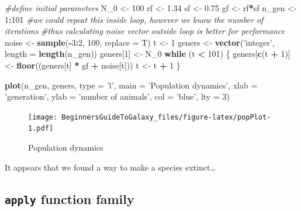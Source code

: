 \documentclass[]{book}
\newenvironment{Shaded}{\begin{snugshade}}{\end{snugshade}}
\newcommand{\KeywordTok}[1]{\textcolor[rgb]{0.13,0.29,0.53}{\textbf{#1}}}
\newcommand{\DataTypeTok}[1]{\textcolor[rgb]{0.13,0.29,0.53}{#1}}
\newcommand{\DecValTok}[1]{\textcolor[rgb]{0.00,0.00,0.81}{#1}}
\newcommand{\FloatTok}[1]{\textcolor[rgb]{0.00,0.00,0.81}{#1}}
\newcommand{\StringTok}[1]{\textcolor[rgb]{0.31,0.60,0.02}{#1}}
\newcommand{\CommentTok}[1]{\textcolor[rgb]{0.56,0.35,0.01}{\textit{#1}}}
\newcommand{\ControlFlowTok}[1]{\textcolor[rgb]{0.13,0.29,0.53}{\textbf{#1}}}
\newcommand{\OperatorTok}[1]{\textcolor[rgb]{0.81,0.36,0.00}{\textbf{#1}}}
\newcommand{\NormalTok}[1]{#1}
\theoremstyle{definition}
\theoremstyle{definition}
\theoremstyle{definition}
\theoremstyle{remark}
\begin{document}
\begin{Shaded}
\begin{Highlighting}[]
\CommentTok{#define initial parameters}
\NormalTok{N_}\DecValTok{0}\NormalTok{   <-}\StringTok{ }\DecValTok{100}
\NormalTok{rf    <-}\StringTok{ }\FloatTok{1.34}
\NormalTok{sf    <-}\StringTok{ }\FloatTok{0.75}
\NormalTok{gf    <-}\StringTok{ }\NormalTok{rf}\OperatorTok{*}\NormalTok{sf}
\NormalTok{n_gen <-}\StringTok{ }\DecValTok{1}\OperatorTok{:}\DecValTok{101}
\CommentTok{#we could repeat this inside loop, however we know the number of iterations}
\CommentTok{#thus calculating noise vector outside loop is better for performance}
\NormalTok{noise <-}\StringTok{ }\KeywordTok{sample}\NormalTok{(}\OperatorTok{-}\DecValTok{3}\OperatorTok{:}\DecValTok{2}\NormalTok{, }\DecValTok{100}\NormalTok{, }\DataTypeTok{replace =}\NormalTok{ T)}
\NormalTok{t <-}\StringTok{ }\DecValTok{1}
\NormalTok{geners <-}\StringTok{ }\KeywordTok{vector}\NormalTok{(}\StringTok{'integer'}\NormalTok{, }\DataTypeTok{length =} \KeywordTok{length}\NormalTok{(n_gen))}
\NormalTok{geners[}\DecValTok{1}\NormalTok{] <-}\StringTok{ }\NormalTok{N_}\DecValTok{0}
\ControlFlowTok{while}\NormalTok{ (t }\OperatorTok{<}\StringTok{ }\DecValTok{101}\NormalTok{) \{}
\NormalTok{  geners[}\KeywordTok{c}\NormalTok{(t }\OperatorTok{+}\StringTok{ }\DecValTok{1}\NormalTok{)] <-}\StringTok{ }\KeywordTok{floor}\NormalTok{((geners[t] }\OperatorTok{*}\StringTok{ }\NormalTok{gf }\OperatorTok{+}\StringTok{ }\NormalTok{noise[t]))}
\NormalTok{  t <-}\StringTok{ }\NormalTok{t }\OperatorTok{+}\StringTok{ }\DecValTok{1}
\NormalTok{\}}

\KeywordTok{plot}\NormalTok{(n_gen, geners, }\DataTypeTok{type =} \StringTok{'l'}\NormalTok{,}
     \DataTypeTok{main =} \StringTok{'Population dynamics'}\NormalTok{,}
     \DataTypeTok{xlab =} \StringTok{'generation'}\NormalTok{, }\DataTypeTok{ylab =} \StringTok{'number of animals'}\NormalTok{,}
     \DataTypeTok{col =} \StringTok{'blue'}\NormalTok{, }\DataTypeTok{lty =} \DecValTok{3}\NormalTok{)}
\end{Highlighting}
\end{Shaded}

\begin{figure}
\centering
\texttt{[image: BeginnersGuideToGalaxy\_files/figure-latex/popPlot-1.pdf]}
\caption{\label{fig:popPlot}Population dynamics}
\end{figure}

It appears that we found a way to make a species extinct\ldots{}

\subsection{\texorpdfstring{\texttt{apply} function
family}{apply function family}}\label{apply-function-family}
\end{document}
